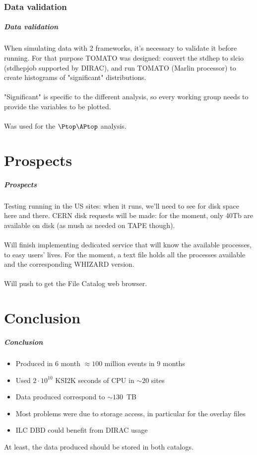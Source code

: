 \documentclass{beamer}
\begin{document}
\section{Data validation}
\begin{frame}
\frametitle{Data validation}
When simulating data with 2 frameworks, it's necessary to validate it before running. For that purpose \alert{TOMATO} was designed: convert the stdhep to slcio (stdhepjob supported by DIRAC), and run TOMATO (Marlin processor) to create histograms of "significant" distributions.  \\
~\\
"Significant" is specific to the different analysis, so every working group needs to provide the variables to be plotted.\\
~\\
Was used for the $\Ptop\APtop$ analysis.
\end{frame}

\part{Prospects}
\begin{frame}
\partpage 
\end{frame}

\begin{frame}
\frametitle{Prospects} 
Testing running in the US sites: when it runs, we'll need to see for disk space here and there. CERN disk requests will be made: for the moment, only 40Tb are available on disk (as mush as needed on TAPE though).\\
~\\
Will finish implementing dedicated service that will know the available processes, to easy users' lives. For the moment, a text file holds all the processes available and the corresponding WHIZARD version.\\
~\\
Will push to get the File Catalog web browser.
\end{frame}

\part{Conclusion}
\begin{frame}
\partpage 
\end{frame}

\begin{frame}
\frametitle{Conclusion} 
\begin{itemize}
\item Produced in 6 month $\approx 100$ million events in 9 months
\item Used $2\cdot 10^{10}$ KSI2K seconds of CPU in $\sim 20$ sites
\item Data produced correspond to $\sim 130$~TB
\item Most problems were due to storage access, in particular for the overlay files
\item ILC DBD could benefit from DIRAC usage
\end{itemize}
At least, the data produced should be stored in both catalogs.
\end{frame}
\end{document}

